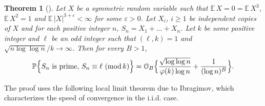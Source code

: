 \documentclass[11pt,draft,reqno]{amsart}
\newtheorem{theorem}{Theorem}[section]
\theoremstyle{definition}
\theoremstyle{remarks}
\numberwithin{equation}{section}
\def \e{{\varepsilon}}
\def\P{{\mathcal P}}
\def\E{{\mathbb E \,}}
\def\P{{\mathbb P}}
\begin{document}
\begin{theorem}[\cite{W5a}]\label{P-Sn} Let $X$ be a symmetric random variable such that   
 $\E X =0=\E X ^3$,  $\E X ^2=1$ and $\E |X| ^{3+\e }<\infty$  for some $\e >0$. Let $X_i$, $i\ge 1$ be independent copies of $X$ and for each positive integer $n$, $S_n= X_1+\ldots + X_n$. Let $k$ be some positive integer and  $\ell$ be an  odd integer such that
   $(\ell,k)=1$ and $
\sqrt{ n  \log\log n}/k\to
\infty$. Then for  every $B>1$,   
$$ \P\Big\{S_n \  \hbox{is prime},\,  S_n\equiv \ell \ ({\rm mod}\, k)\Big\}={\mathcal O}_B\Big\{   {\sqrt{   
\log\log n}\over \varphi(k)\log    n   } +  {  1\over (\log n)^{B} }\Big\}.
$$ 
\end{theorem}  








The proof uses the following local limit theorem due to Ibragimov, which characterizes the speed of convergence in the i.i.d. case. 
 
\end{document}
